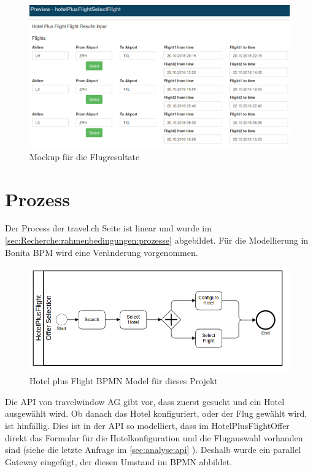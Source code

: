 \begin{figure}[H]
	\centering
	\includegraphics[width=1\textwidth]{images/forms-select-flight.png}
	\caption{Mockup für die Flugresultate}
	\label{fig:konzept:mockups:selectflight}
\end{figure}


\section{Prozess}
\label{sec:konzept:prozess}
Der Process der travel.ch Seite ist linear und wurde im \cref{sec:Recherche:rahmenbedingungen:prozesse}  abgebildet. Für die Modellierung in Bonita BPM wird eine Veränderung vorgenommen.
\begin{figure}[H]
	\centering
	\includegraphics[width=1\textwidth]{images/hotelplusflightbonita.png}
	\caption{Hotel plus Flight BPMN Model für dieses Projekt}
	\label{fig:konzept:mockups:selectflight}
\end{figure}
Die API von travelwindow AG gibt vor, dass zuerst gesucht und ein Hotel ausgewählt wird. Ob danach das Hotel konfiguriert, oder der Flug gewählt wird, ist hinfällig. Dies ist in der API so modelliert, dass im HotelPlusFlightOffer direkt das Formular für die Hotelkonfiguration und die Flugauswahl vorhanden sind (siehe die letzte Anfrage im \cref{sec:analyse:api} ). Deshalb wurde ein parallel Gateway eingefügt, der diesen Umstand im BPMN abbildet.